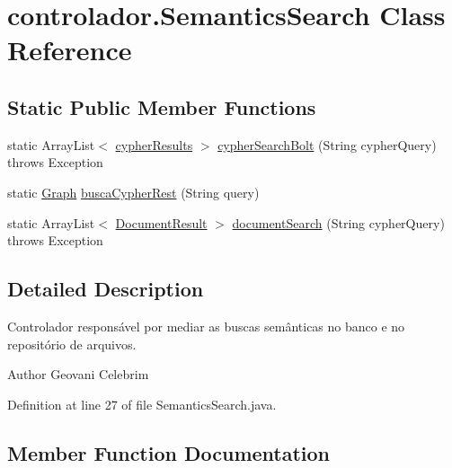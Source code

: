 \hypertarget{classcontrolador_1_1SemanticsSearch}{}\section{controlador.\+Semantics\+Search Class Reference}
\label{classcontrolador_1_1SemanticsSearch}
\subsection*{Static Public Member Functions}
\begin{DoxyCompactItemize}
\item 
static Array\+List$<$ \hyperlink{classentidade_1_1resultados_1_1cypherResults}{cypher\+Results} $>$ \hyperlink{classcontrolador_1_1SemanticsSearch_a339848789ce165207406c6ee6f49c538}{cypher\+Search\+Bolt} (String cypher\+Query)  throws Exception 
\item 
static \hyperlink{classentidade_1_1Graph}{Graph} \hyperlink{classcontrolador_1_1SemanticsSearch_af6332056f2b69450b64220a5b11a69f4}{busca\+Cypher\+Rest} (String query)
\item 
static Array\+List$<$ \hyperlink{classentidade_1_1resultados_1_1DocumentResult}{Document\+Result} $>$ \hyperlink{classcontrolador_1_1SemanticsSearch_a0cd2e6b6e45fe9738ea91c606a48afef}{document\+Search} (String cypher\+Query)  throws Exception 
\end{DoxyCompactItemize}


\subsection{Detailed Description}
Controlador responsável por mediar as buscas semânticas no banco e no repositório de arquivos.

\begin{DoxyAuthor}{Author}
Geovani Celebrim 
\end{DoxyAuthor}


Definition at line 27 of file Semantics\+Search.\+java.



\subsection{Member Function Documentation}
\hypertarget{classcontrolador_1_1SemanticsSearch_af6332056f2b69450b64220a5b11a69f4}{}\label{classcontrolador_1_1SemanticsSearch_af6332056f2b69450b64220a5b11a69f4} 
